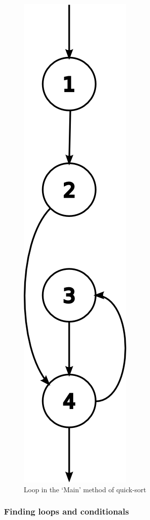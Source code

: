 \documentclass[12pt,twoside,notitlepage]{report}
\begin{document}
\begin{figure}[tbh]
\centerline{\includegraphics{figs/QuickSortMain.png}}
\caption{\label{QuickSortMain}Loop in the `Main' method of quick-sort}
\end{figure}

\subsubsection{Finding loops and conditionals}
\end{document}
